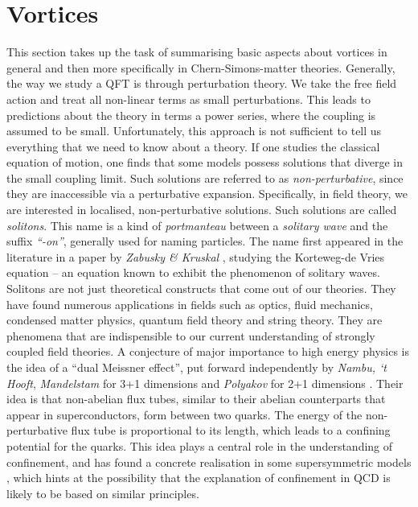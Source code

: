         \section{Vortices} \label{vortices_sec}
This section takes up the task of summarising basic aspects about vortices in general and then more specifically in Chern-Simons-matter theories.
        Generally, the way we study a QFT is through perturbation theory. We take the free field action and treat all non-linear terms as small perturbations. This leads to predictions about the theory in terms a power series, where the coupling is assumed to be small. Unfortunately, this approach is not sufficient to tell us everything that we need to know about a theory. If one studies the classical equation of motion, one finds that some models possess solutions that diverge in the small coupling limit. Such solutions are referred to as \textit{non-perturbative}, since they are inaccessible via a perturbative expansion. Specifically, in field theory, we are interested in localised, non-perturbative solutions. Such solutions are called \textit{solitons}. This name is a kind of \textit{portmanteau} between a \textit{solitary wave} and the suffix \textit{``-on''}, generally used for naming particles. The name first appeared in the literature in a paper by \textit{Zabusky \& Kruskal} \cite{PhysRevLett.15.240}, studying the Korteweg-de Vries equation -- an equation known to exhibit the phenomenon of solitary waves. \\
       \indent Solitons are not just theoretical constructs that come out of our theories. They have found numerous applications in fields such as optics, fluid mechanics, condensed matter physics, quantum field theory and string theory. They are phenomena that are indispensible to our current understanding of strongly coupled field theories. A conjecture of major importance to high energy physics is the idea of a ``dual Meissner effect'', put forward independently by \textit{Nambu, `t Hooft}, \textit{Mandelstam} for 3+1 dimensions and  \textit{Polyakov} for 2+1 dimensions \cite{Mandelstam:1974pi, tHooft:1974kcl, PhysRevD.10.4262, Polyakov1977}. Their idea is that non-abelian flux tubes, similar to their abelian counterparts that appear in superconductors, form between two quarks. The energy of the non-perturbative flux tube is proportional to its length, which leads to a confining potential for the quarks. This idea plays a central role in the understanding of confinement, and has found a concrete realisation in some supersymmetric models \cite{Seiberg1994, Seiberg:1994rs}, which hints at the possibility that the explanation of confinement in QCD is likely to be based on similar principles.  

